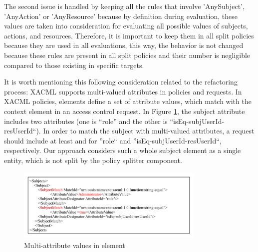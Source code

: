 The second issue is handled by keeping all the rules that involve 'AnySubject', 'AnyAction' or 'AnyResource' because by definition during 
evaluation, these values are taken into consideration for evaluating all possible values of subjects, actions, and resources. 
Therefore, it is important to keep them in all split policies because they are used in all evaluations, this way, the behavior is not changed because these rules are present in all split policies and 
their number is negligible compared to those existing in specific targets. 


It is worth mentioning this following consideration related to the refactoring process:
XACML supports multi-valued attributes in policies and requests. In XACML policies,  elements define a set of attribute values, which match with 
the context element in 
an access control request. In Figure \ref{xacml-match}, the subject attribute includes two attributes (one is ``role'' and the other 
is ``isEq-subjUserId-resUserId``). In order to match the subject with multi-valued attributes, a request should include at least  and  
for ''role`` and ''isEq-subjUserId-resUserId``, respectively.
Our approach considers such a whole subject element as a single entity, which is not split by the policy splitter component.
\begin{figure}[!h]
\begin{center}
\includegraphics[width=9cm, height=3.5cm]{xacml-match}
\caption{Multi-attribute values in  element}
\label{xacml-match}
\end{center}
\end{figure}

